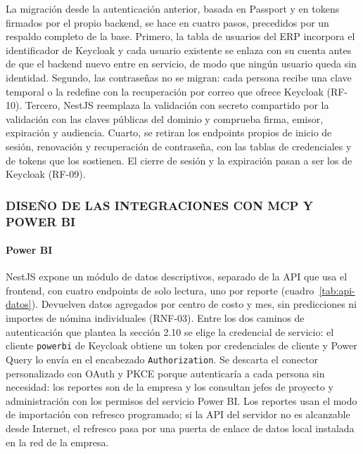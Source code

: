 La migración desde la autenticación anterior, basada en Passport y en tokens firmados por el propio backend, se hace en cuatro pasos, precedidos por un respaldo completo de la base. Primero, la tabla de usuarios del ERP incorpora el identificador de Keycloak y cada usuario existente se enlaza con su cuenta antes de que el backend nuevo entre en servicio, de modo que ningún usuario queda sin identidad. Segundo, las contraseñas no se migran: cada persona recibe una clave temporal o la redefine con la recuperación por correo que ofrece Keycloak (RF-10). Tercero, NestJS reemplaza la validación con secreto compartido por la validación con las claves públicas del dominio y comprueba firma, emisor, expiración y audiencia. Cuarto, se retiran los endpoints propios de inicio de sesión, renovación y recuperación de contraseña, con las tablas de credenciales y de tokens que los sostienen. El cierre de sesión y la expiración pasan a ser los de Keycloak (RF-09).

\subsubsection{DISEÑO DE LAS INTEGRACIONES CON MCP Y POWER BI}

\paragraph{Power BI}

NestJS expone un módulo de datos descriptivos, separado de la API que usa el frontend, con cuatro endpoints de solo lectura, uno por reporte (cuadro~\ref{tab:api-datos}). Devuelven datos agregados por centro de costo y mes, sin predicciones ni importes de nómina individuales (RNF-03). Entre los dos caminos de autenticación que plantea la sección 2.10 se elige la credencial de servicio: el cliente \texttt{powerbi} de Keycloak obtiene un token por credenciales de cliente y Power Query lo envía en el encabezado \texttt{Authorization}. Se descarta el conector personalizado con OAuth y PKCE porque autenticaría a cada persona sin necesidad: los reportes son de la empresa y los consultan jefes de proyecto y administración con los permisos del servicio Power BI\@. Los reportes usan el modo de importación con refresco programado; si la API del servidor no es alcanzable desde Internet, el refresco pasa por una puerta de enlace de datos local instalada en la red de la empresa.

